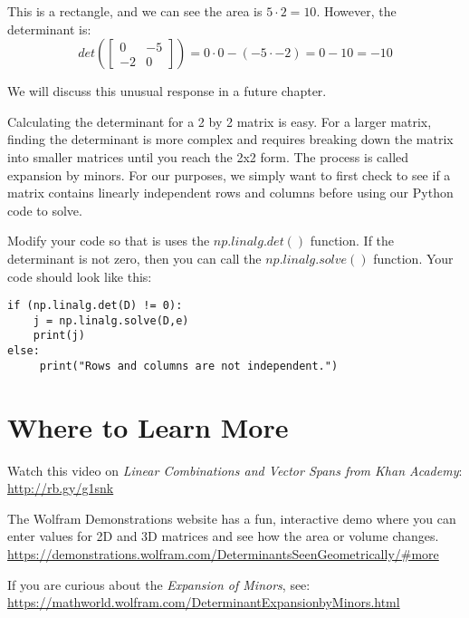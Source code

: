 \begin{Answer}[ref = geo_det]
\begin{enumerate}

    This is a rectangle, and we can see the area is $5 \cdot 2 = 10$. However, 
    the determinant is:
    $$det \left( \begin{bmatrix}
        0 & -5\\
        -2 & 0
    \end{bmatrix} \right) = 0 \cdot 0 - \left( -5 \cdot -2 \right) = 0 - 10 = 
    -10$$

    We will discuss this unusual response in a future chapter. 
\end{enumerate}
\end{Answer}

Calculating the determinant for a 2 by 2 matrix is easy. For a larger matrix, 
finding the determinant is more complex and requires breaking down the matrix 
into smaller matrices until you reach the 2x2 form. The process is called 
expansion by minors. For our purposes, we simply want to first check to see if 
a matrix contains linearly independent rows and columns before using our 
Python code to solve. 

Modify your code so that is uses the $np.linalg.det()$ function. If the 
determinant is not zero, then you can call the $np.linalg.solve()$ function. 
Your code should look like this:
\begin{Verbatim}
if (np.linalg.det(D) != 0):
    j = np.linalg.solve(D,e)
    print(j)
else:
     print("Rows and columns are not independent.")
\end{Verbatim}

\section{Where to Learn More}
Watch this video on \emph {Linear Combinations and Vector Spans from Khan 
Academy}: \url{http://rb.gy/g1snk}

The Wolfram Demonstrations website has a fun, interactive demo where you can 
enter values for 2D and 3D matrices and see how the area or volume changes. 
\url{https://demonstrations.wolfram.com/DeterminantsSeenGeometrically/#more}

If you are curious about the \emph {Expansion of Minors}, see:
\url {https://mathworld.wolfram.com/DeterminantExpansionbyMinors.html}